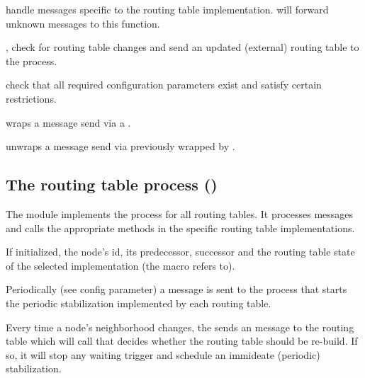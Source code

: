 \begin{description}
\item {} handle messages specific to the routing
  table implementation.  will forward unknown messages
  to this function.

\item {},  check for routing table changes and send
  an updated (external) routing table to the  process.

\item {} check that all required configuration parameters
  exist and satisfy certain restrictions.

\item {} wraps a message send via a .

\item {} unwraps a message send via 
previously wrapped by .

\end{description}

\subsection{The routing table process (\texorpdfstring{}{rt\_loop})}

The  module implements the process for all routing tables.
It processes messages and calls the appropriate methods in the specific routing
table implementations.

If initialized, the node's id, its predecessor, successor and the routing table
state of the selected implementation (the macro  refers to).

Periodically (see  config parameter) a 
message is sent to the  process that starts the periodic
stabilization implemented by each routing table.

Every time a node's neighborhood changes, the  sends an
 message to the routing table which will call
 that decides whether the routing table should be
re-build. If so, it will stop any waiting trigger and schedule an immideate
(periodic) stabilization.

